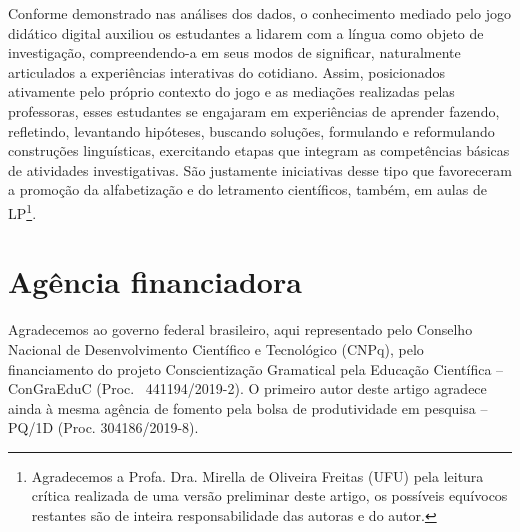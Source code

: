 Conforme demonstrado nas análises dos dados, o conhecimento mediado pelo
jogo didático digital auxiliou os estudantes a lidarem com a língua como
objeto de investigação, compreendendo-a em seus modos de significar,
naturalmente articulados a experiências interativas do cotidiano. Assim,
posicionados ativamente pelo próprio contexto do jogo e as mediações
realizadas pelas professoras, esses estudantes se engajaram em
experiências de aprender fazendo, refletindo, levantando hipóteses,
buscando soluções, formulando e reformulando construções linguísticas,
exercitando etapas que integram as competências básicas de atividades
investigativas. São justamente iniciativas desse tipo que favoreceram a
promoção da alfabetização e do letramento científicos, também, em aulas
de LP\footnote{Agradecemos a Profa. Dra. Mirella de Oliveira Freitas
	(UFU) pela leitura crítica realizada de uma versão preliminar deste
	artigo, os possíveis equívocos restantes são de inteira
	responsabilidade das autoras e do autor.}.
	
	
\section{Agência financiadora}\label{sec-agênciafinanciadora}
Agradecemos ao governo federal brasileiro, aqui representado pelo
Conselho Nacional de Desenvolvimento Científico e Tecnológico (CNPq),
pelo financiamento do projeto Conscientização Gramatical pela Educação
Científica -- ConGraEduC (Proc. ~441194/2019-2). O primeiro autor deste
artigo agradece ainda à mesma agência de fomento pela bolsa de
produtividade em pesquisa -- PQ/1D (Proc. 304186/2019-8).
